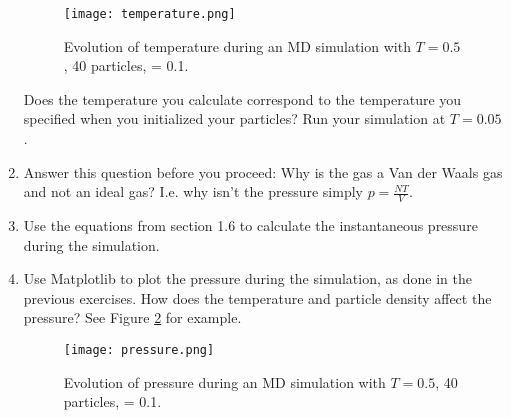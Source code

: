 \documentclass{article}
\begin{document}
\begin{enumerate}[resume]
    \begin{figure}[h!]
        \begin{center}
            \texttt{[image: temperature.png]}
            \caption{Evolution of temperature during an MD simulation with $T = 0.5$, 40 particles,  = 0.1.}
            \label{fig:temperature}
        \end{center}
    \end{figure}

    Does the temperature you calculate correspond to the temperature you specified when you initialized your particles?
    Run your simulation at $T = 0.05$.

    \item Answer this question before you proceed: Why is the gas a Van der Waals gas and not an ideal gas?
        I.e. why isn't the pressure simply $p = \frac{N T}{V}$.

    \item
        Use the equations from section 1.6 to calculate the instantaneous pressure during the simulation. 

    \item Use Matplotlib to plot the pressure during the simulation, as done in the previous exercises.
        How does the temperature and particle density affect the pressure?
        See Figure \ref{fig:pressure} for example.

        \begin{figure}[h!]
            \begin{center}
                \texttt{[image: pressure.png]}
                \caption{Evolution of pressure during an MD simulation with $T = 0.5$, 40 particles,  = 0.1.}
                \label{fig:pressure}
            \end{center}
        \end{figure}

\end{enumerate}

\end{document}
